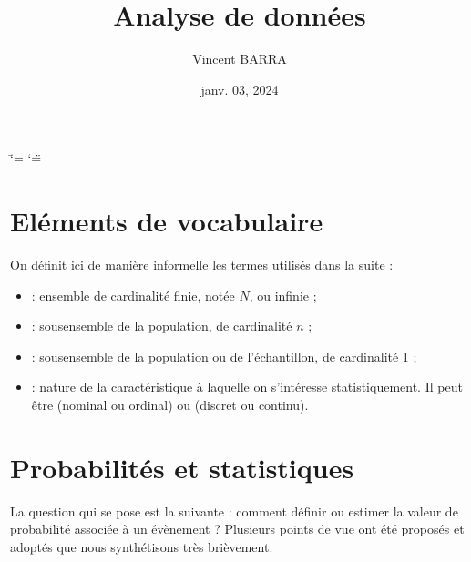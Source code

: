 \documentclass[letterpaper,10pt,french]{sphinxmanual}
\title{Analyse de données}
\date{janv. 03, 2024}
\author{Vincent BARRA}
\begin{document}
\ifdefined\shorthandoff
  \ifnum\catcode`\=\string=\active\shorthandoff{=}\fi
  \ifnum\catcode`\"=\active{}\fi
\fi

\pagestyle{empty}
\sphinxmaketitle
\pagestyle{plain}
\sphinxtableofcontents
\pagestyle{normal}
\label{\detokenize{intro::doc}}



\chapter{Eléments de vocabulaire}
\label{\detokenize{intro:elements-de-vocabulaire}}
\sphinxAtStartPar
On définit ici de manière informelle les termes utilisés dans la suite :

\ignorespaces \begin{itemize}
\item {} 
\sphinxAtStartPar
{} : ensemble de cardinalité finie, notée \(N\), ou infinie ;

\end{itemize}

\ignorespaces \begin{itemize}
\item {} 
\sphinxAtStartPar
{} : sous\sphinxhyphen{}ensemble de la population, de cardinalité \(n\) ;

\end{itemize}

\ignorespaces \begin{itemize}
\item {} 
\sphinxAtStartPar
{} : sous\sphinxhyphen{}ensemble de la population ou de l’échantillon, de cardinalité 1 ;

\end{itemize}

\ignorespaces \begin{itemize}
\item {} 
\sphinxAtStartPar
{} : nature de la caractéristique à laquelle on s’intéresse statistiquement. Il peut être  (nominal ou ordinal) ou  (discret ou continu).

\end{itemize}


\chapter{Probabilités et statistiques}
\label{\detokenize{intro:probabilites-et-statistiques}}
\sphinxAtStartPar
La question qui se pose est la suivante : comment définir ou estimer la valeur de probabilité associée à un  évènement ?
Plusieurs points de vue ont été proposés et adoptés que nous synthétisons très brièvement.
\end{document}
